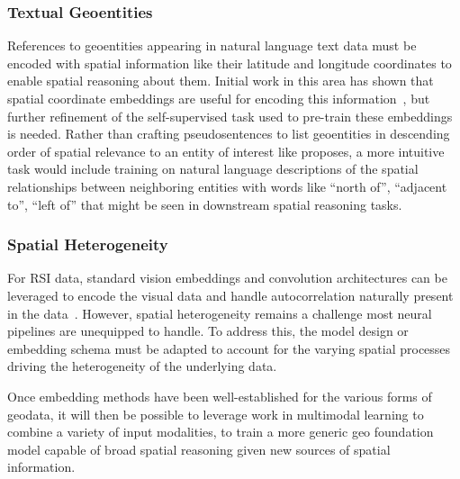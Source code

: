 \subsubsection{Textual Geoentities}
References to geoentities appearing in natural language text data must be encoded with spatial information like their latitude and longitude coordinates to enable spatial reasoning about them.
Initial work in this area has shown that spatial coordinate embeddings are useful for encoding this information~\cite{Li2021}, but further refinement of the self-supervised task used to pre-train these embeddings is needed.
Rather than crafting pseudosentences to list geoentities in descending order of spatial relevance to an entity of interest like \citeauthor{Li2021} proposes, a more intuitive task would include training on natural language descriptions of the spatial relationships between neighboring entities with words like ``north of'', ``adjacent to'', ``left of'' that might be seen in downstream spatial reasoning tasks.


\subsubsection{Spatial Heterogeneity}
For RSI data, standard vision embeddings and convolution architectures can be leveraged to encode the visual data and handle autocorrelation naturally present in the data~\cite{Xie2021}.
However, spatial heterogeneity remains a challenge most neural pipelines are unequipped to handle.
To address this, the model design or embedding schema must be adapted to account for the varying spatial processes driving the heterogeneity of the underlying data.



Once embedding methods have been well-established for the various forms of geodata, it will then be possible to leverage work in multimodal learning to combine a variety of input modalities, to train a more generic geo foundation model capable of broad spatial reasoning given new sources of spatial information.

